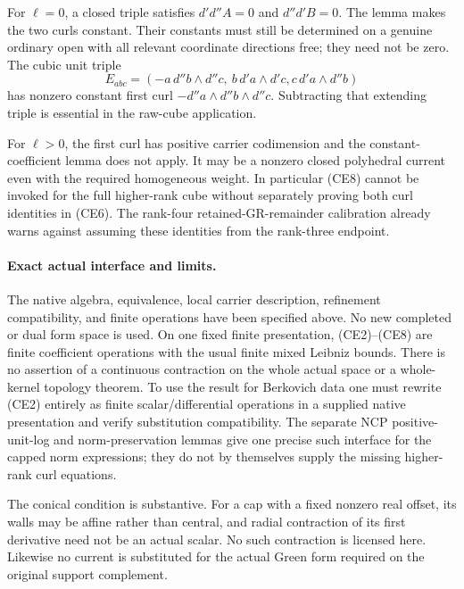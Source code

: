 For $\ell=0$, a closed triple satisfies
$d'd''A=0$ and $d''d'B=0$.  The lemma makes the two curls
constant.  Their constants must still be determined on a genuine
ordinary open with all relevant coordinate directions free; they
need not be zero.  The cubic unit triple
\[
 E_{abc}=(-a\,d''b\wedge d''c,\ b\,d'a\wedge d'c,
                                      c\,d'a\wedge d''b)
 \tag{CE13}
\]
has nonzero constant first curl
$-d''a\wedge d''b\wedge d''c$.  Subtracting that extending
triple is essential in the raw-cube application.

For $\ell>0$, the first curl has positive carrier codimension and
the constant-coefficient lemma does not apply.  It may be a nonzero
closed polyhedral current even with the required homogeneous weight.
In particular (CE8) cannot be invoked for the full higher-rank cube
without separately proving both curl identities in (CE6).  The
rank-four retained-GR-remainder calibration already warns against
assuming these identities from the rank-three endpoint.

\paragraph{Exact actual interface and limits.}
The native algebra, equivalence, local carrier description, refinement
compatibility, and finite operations have been specified above.
No new completed or dual form space is used.  On one fixed finite
presentation, (CE2)--(CE8) are finite coefficient operations with the
usual finite mixed Leibniz bounds.  There is no assertion of a
continuous contraction on the whole actual space or a whole-kernel
topology theorem.  To use the result for Berkovich data one must
rewrite (CE2) entirely as finite scalar/differential operations in a
supplied native presentation and verify substitution compatibility.
The separate NCP positive-unit-log and norm-preservation lemmas give
one precise such interface for the capped norm expressions; they do
not by themselves supply the missing higher-rank curl equations.

The conical condition is substantive.  For a cap with a fixed nonzero
real offset, its walls may be affine rather than central, and radial
contraction of its first derivative need not be an actual scalar.
No such contraction is licensed here.  Likewise no current is
substituted for the actual Green form required on the original
support complement.
